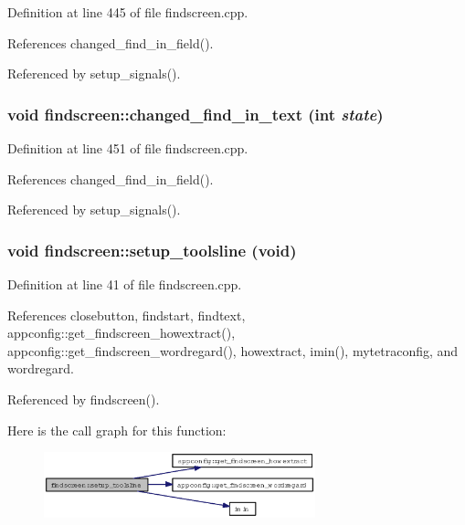 Definition at line 445 of file findscreen.cpp.

References changed\_\-find\_\-in\_\-field().

Referenced by setup\_\-signals().
\subsubsection{\setlength{\rightskip}{0pt plus 5cm}void findscreen::changed\_\-find\_\-in\_\-text (int {\em state})\hspace{0.3cm}{\tt  [private, slot]}}\label{classfindscreen_f9518294e39ae69c0d5d85f6061de152}




Definition at line 451 of file findscreen.cpp.

References changed\_\-find\_\-in\_\-field().

Referenced by setup\_\-signals().
\subsubsection{\setlength{\rightskip}{0pt plus 5cm}void findscreen::setup\_\-toolsline (void)\hspace{0.3cm}{\tt  [private]}}\label{classfindscreen_21d3d00b4559ddbafc3cf6332a422a16}




Definition at line 41 of file findscreen.cpp.

References closebutton, findstart, findtext, appconfig::get\_\-findscreen\_\-howextract(), appconfig::get\_\-findscreen\_\-wordregard(), howextract, imin(), mytetraconfig, and wordregard.

Referenced by findscreen().

Here is the call graph for this function:\begin{figure}[H]
\begin{center}
\leavevmode
\includegraphics[width=223pt]{classfindscreen_21d3d00b4559ddbafc3cf6332a422a16_cgraph}
\end{center}
\end{figure}


